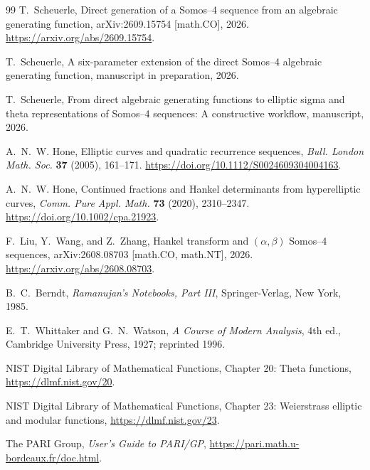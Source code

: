 \documentclass[11pt]{article}
\begin{document}
\begin{thebibliography}{99}
T.~Scheuerle,
\newblock Direct generation of a Somos--4 sequence from an algebraic generating function,
\newblock arXiv:2609.15754 [math.CO], 2026.
\newblock \url{https://arxiv.org/abs/2609.15754}.

T.~Scheuerle,
\newblock A six-parameter extension of the direct Somos--4 algebraic generating function,
\newblock manuscript in preparation, 2026.

T.~Scheuerle,
\newblock From direct algebraic generating functions to elliptic sigma and theta representations of Somos--4 sequences: A constructive workflow,
\newblock manuscript, 2026.

A.~N.~W. Hone,
\newblock Elliptic curves and quadratic recurrence sequences,
\newblock \emph{Bull. London Math. Soc.} \textbf{37} (2005), 161--171.
\newblock \url{https://doi.org/10.1112/S0024609304004163}.

A.~N.~W. Hone,
\newblock Continued fractions and Hankel determinants from hyperelliptic curves,
\newblock \emph{Comm. Pure Appl. Math.} \textbf{73} (2020), 2310--2347.
\newblock \url{https://doi.org/10.1002/cpa.21923}.

F.~Liu, Y.~Wang, and Z.~Zhang,
\newblock Hankel transform and $(\alpha,\beta)$ Somos--4 sequences,
\newblock arXiv:2608.08703 [math.CO, math.NT], 2026.
\newblock \url{https://arxiv.org/abs/2608.08703}.

B.~C.~Berndt,
\newblock \emph{Ramanujan's Notebooks, Part III},
\newblock Springer-Verlag, New York, 1985.

E.~T.~Whittaker and G.~N.~Watson,
\newblock \emph{A Course of Modern Analysis}, 4th ed.,
\newblock Cambridge University Press, 1927; reprinted 1996.

NIST Digital Library of Mathematical Functions,
\newblock Chapter 20: Theta functions,
\newblock \url{https://dlmf.nist.gov/20}.

NIST Digital Library of Mathematical Functions,
\newblock Chapter 23: Weierstrass elliptic and modular functions,
\newblock \url{https://dlmf.nist.gov/23}.

The PARI Group,
\newblock \emph{User's Guide to PARI/GP},
\newblock \url{https://pari.math.u-bordeaux.fr/doc.html}.
\end{thebibliography}
\end{document}
